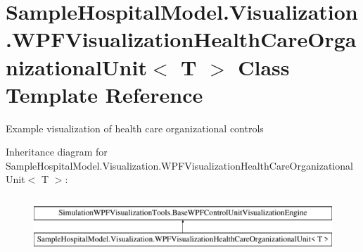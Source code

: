 \hypertarget{class_sample_hospital_model_1_1_visualization_1_1_w_p_f_visualization_health_care_organizational_unit}{}\section{Sample\+Hospital\+Model.\+Visualization.\+W\+P\+F\+Visualization\+Health\+Care\+Organizational\+Unit$<$ T $>$ Class Template Reference}
\label{class_sample_hospital_model_1_1_visualization_1_1_w_p_f_visualization_health_care_organizational_unit}


Example visualization of health care organizational controls  


Inheritance diagram for Sample\+Hospital\+Model.\+Visualization.\+W\+P\+F\+Visualization\+Health\+Care\+Organizational\+Unit$<$ T $>$\+:\begin{figure}[H]
\begin{center}
\leavevmode
\includegraphics[height=2.000000cm]{class_sample_hospital_model_1_1_visualization_1_1_w_p_f_visualization_health_care_organizational_unit}
\end{center}
\end{figure}
